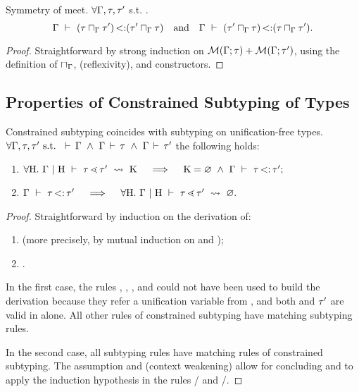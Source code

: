 \begin{lemma}{Symmetry of meet.}
    $\forall \Gamma, \tau, \tau'$ s.t. .
    \[
        \Gamma\ \vdash\ (\tau \sqcap_{\Gamma} \tau') \operatorname{<:} (\tau' \sqcap_{\Gamma} \tau)
        \quad\text{and}\quad
        \Gamma\ \vdash\ (\tau' \sqcap_{\Gamma} \tau) \operatorname{<:} (\tau \sqcap_{\Gamma} \tau').
    \]
\end{lemma}
\begin{proof}
    Straightforward by strong induction on
    $\operatorname{\mathcal{M}}(\Gamma;\tau) + \operatorname{\mathcal{M}}(\Gamma;\tau')$,
    using the definition of $\sqcap_{\Gamma}$,
     (reflexivity),
    and \RST{} constructors.
\end{proof}



\subsection{Properties of Constrained Subtyping of Types}%
\label{subsec:props-subtyctr-proof}

\begin{lemma}{Constrained subtyping coincides with subtyping on
    unification-free types.}%
\label{lem:subtyctr-subty}
    $\forall \AEnv, \ty, \ty' \text{ s.t. } 
    \tyvld{}{\AEnv} \ \land\ \tyvlddflt{\ty} \ \land\ \tyvlddflt{\ty'}$ 
    the following holds:
    \begin{enumerate}
        \item $\forall \UEnvD.\ \subtyctrdflt{\ty}{\ty'} \quad\implies\quad
            \CSet = \EmptyCSet\ \land\ \subtydflt{\ty}{\ty'};$
        \item $\subtydflt{\ty}{\ty'} \quad\implies\quad 
            \forall \UEnvD.\ \subtyctrdfltenv{\ty}{\ty'}{\EmptyCSet}.$
    \end{enumerate}
\end{lemma}
\begin{proof}
    Straightforward by induction on the derivation of:
    \begin{enumerate}
        \item {} (more precisely, by mutual induction
            on  and );
        \item {}.
    \end{enumerate}

    In the first case, the rules , , ,
    and  could not have been used to build the derivation
    because they refer a unification variable \va from \UEnvD,
    and both \ty and $\tau'$ are valid in \AEnv alone.
    All other rules of constrained subtyping have matching subtyping rules.

    In the second case, all subtyping rules have matching rules of constrained
    subtyping.
    The assumption \tyvld{}{\AEnv} and  (context
    weakening) allow for concluding 
    \tyvlddflt{\plug\dctx\tyub} and \tyvlddflt{\tylb} 
    to apply the induction hypothesis in the rules
    / and /.
\end{proof}

